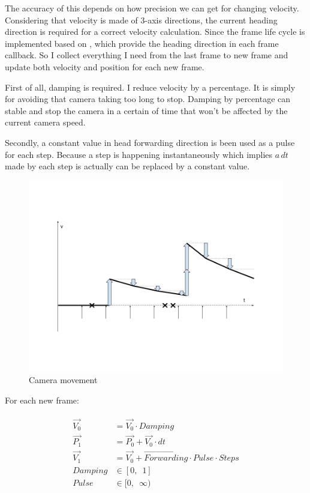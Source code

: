 The accuracy of this depends on how precision we can get for changing velocity. Considering that velocity is made of 3-axis directions, the current heading direction is required for a correct velocity calculation. Since the frame life cycle is implemented based on \cite{google.vr-sdk.2016}, which provide the heading direction in each frame callback. So I collect everything I need from the last frame to new frame and update both velocity and position for each new frame.

First of all, damping is required. I reduce velocity by a percentage. It is simply for avoiding that camera taking too long to stop. Damping by percentage can stable and stop the camera in a certain of time that won't be affected by the current camera speed. 

Secondly, a constant value in head forwarding direction is been used as a pulse for each step. Because a step is happening instantaneously which implies $a\,dt$ made by each step is actually can be replaced by a constant value.

\begin{figure}[H]
\caption{Camera movement}
\label{fig:camera-movement}
\centering
\includegraphics[width=\linewidth]{Figures/camera-movement.png}
\decoRule
\end{figure}

For each new frame:

\[
\begin{array}{lr}
\begin{aligned}
\overrightarrow{V_0} &= \overrightarrow{V_0} \cdot Damping\\
\overrightarrow{P_1} &= \overrightarrow{P_0} + \overrightarrow{V_0} \cdot dt\\
\overrightarrow{V_1} &= \overrightarrow{V_0} + \overrightarrow{Forwarding} \cdot Pulse \cdot Steps\\
Damping &\in [0,\enspace1]\\
Pulse &\in [0,\enspace \infty)\\
\end{aligned}
\end{array}
\]

